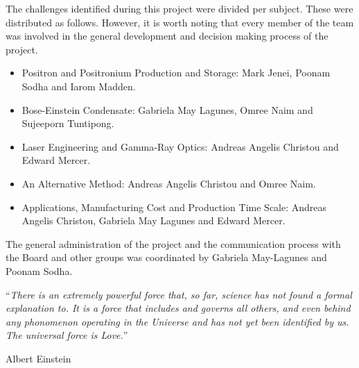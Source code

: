 \documentclass[11pt, english, singlespacing, headsepline,]{FinalReport}
\begin{document}
\begin{responsibility}
\addchaptertocentry{\responsibilityname}

\noindent The challenges identified during this project were divided per subject. These were distributed as follows. However, it is worth noting that every member of the team was involved in the general development and decision making process of the project. 

\begin{itemize} 
 \item Positron and Positronium Production and Storage: Mark Jenei, Poonam Sodha and Iarom Madden.
 \item Bose-Einstein Condensate: Gabriela May Lagunes, Omree Naim and Sujeeporn Tuntipong.
 \item Laser Engineering and Gamma-Ray Optics: Andreas Angelis Christou and Edward Mercer.
 \item An Alternative Method: Andreas Angelis Christou and Omree Naim.
 \item Applications, Manufacturing Cost and Production Time Scale: Andreas Angelis Christou, Gabriela May Lagunes and Edward Mercer.
\end{itemize}
 
\noindent The general administration of the project and the communication process with the Board and other groups was coordinated by Gabriela May-Lagunes and Poonam Sodha.\\
 
\end{responsibility}

\cleardoublepage


\vspace*{0.2\textheight}

\noindent\enquote{\itshape There is an extremely powerful force that, so far, science has not found a formal explanation to. It is a force that includes and governs all others, and even behind any phonomenon operating in the Universe and has not yet been identified by us. The universal force is Love.}\bigbreak

\hfill Albert Einstein

\end{document}
